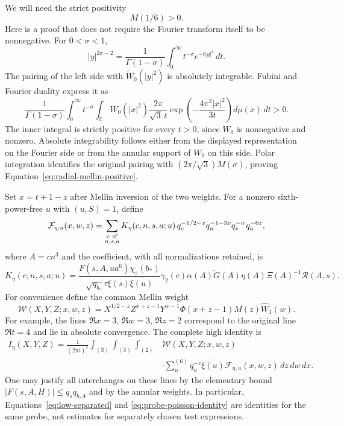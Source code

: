 \documentclass[11pt,a4paper]{article}
\numberwithin{equation}{section}
\numberwithin{figure}{section}
\theoremstyle{definition}
\theoremstyle{remark}
\begin{document}
We will need the strict positivity
\begin{equation}\label{eq:radial-mellin-positive}
 M(1/6)>0.
\end{equation}
Here is a proof that does not require the Fourier transform itself
to be nonnegative.  For $0<\sigma<1$,
\[
 |y|^{2\sigma-2}=\frac1{\Gamma(1-\sigma)}
             \int_0^\infty t^{-\sigma}e^{-t|y|^2}\,dt.
\]
The pairing of the left side with $\widetilde W_0(|y|^2)$ is
absolutely integrable.  Fubini and Fourier duality express it as
\[
 \frac1{\Gamma(1-\sigma)}\int_0^\infty t^{-\sigma}
 \int_{\mathbb C}W_0(|x|^2)
       \frac{2\pi}{\sqrt3\,t}
       \exp\!\left(-\frac{4\pi^2|x|^2}{3t}\right)
                  d\mu(x)\,dt>0.
\]
The inner integral is strictly positive for every $t>0$, since
$W_0$ is nonnegative and nonzero.  Absolute integrability follows
either from the displayed representation on the Fourier side or
from the annular support of $W_0$ on this side.  Polar integration
identifies the original pairing with $(2\pi/\sqrt3)M(\sigma)$,
proving Equation~\eqref{eq:radial-mellin-positive}.

Set $x=t+1-z$ after Mellin inversion of the two weights.  For a
nonzero sixth-power-free $u$ with $(u,S)=1$, define
\begin{equation}\label{eq:local-full-series}
 \mathcal F_{\eta,u}(x,w,z)=
 \sum_{\substack{c\ {\rm sf}\\n,s,a}}
 K_\eta(c,n,s,a;u)\,
 q_c^{-1/2-x}q_n^{-1-3x}q_s^{-w}q_a^{-6z},
\end{equation}
where $A=cn^3$ and the coefficient, with all normalizations retained,
is
\begin{equation}\label{eq:local-full-coefficient}
 K_\eta(c,n,s,a;u)=
 \frac{F(s,A,ua^6)\chi_s(b_*)}
 {\sqrt{q_{b_*}}\tau\xi(s)\overline{\xi(u)}}
 \gamma_2(c)\overline{\alpha(A)G(A)}
 \eta(A)\Xi(A)^{-1}\mathcal R(A,s).
\end{equation}
For convenience define the common Mellin weight
\[
 \mathcal W(X,Y,Z;x,w,z)=
 X^{1/2-z}Z^{x+z-1}Y^{w-1}
 \Phi(x+z-1)M(z)\widehat W_1(w).
\]
For example, the lines $\Re x=3$, $\Re w=3$, $\Re z=2$ correspond
to the original line $\Re t=4$ and lie in absolute convergence.
The complete high identity is
\begin{equation}\label{eq:probe-poisson-identity}
 \begin{split}
 I_\eta(X,Y,Z)=\frac1{(2\pi i)^3}
 \int_{(3)}\int_{(3)}\int_{(2)}
 &\mathcal W(X,Y,Z;x,w,z)\\
 &\cdot\sum_u^{(6)}q_u^{-z}\overline{\xi(u)}
             \mathcal F_{\eta,u}(x,w,z)\,dz\,dw\,dx.
 \end{split}
\end{equation}
One may justify all interchanges on these lines by the elementary
bound $|F(s,A,H)|\le q_sq_{b_*A}$ and by the annular weights.
In particular, Equations~\eqref{eq:low-separated} and
\eqref{eq:probe-poisson-identity} are identities for the same
probe, not estimates for separately chosen test expressions.
\end{document}
